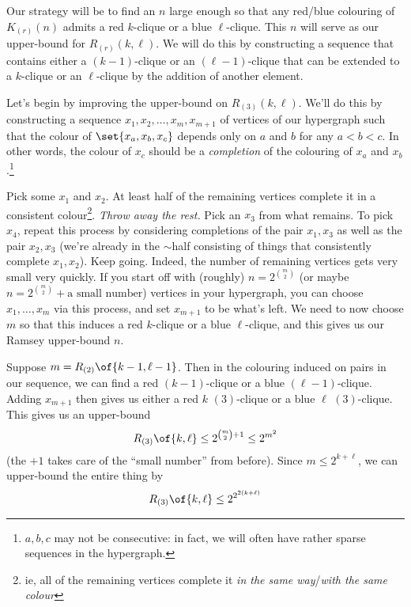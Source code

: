 Our strategy will be to find an $n$ large enough so that any red/blue colouring of $K_{(r)}(n)$ admits a red $k$-clique or a blue $\ell$-clique. This $n$ will serve as our upper-bound for $R_{(r)}(k, \ell)$. We will do this by constructing a sequence that contains either a $(k - 1)$-clique or an $(\ell - 1)$-clique that can be extended to a $k$-clique or an $\ell$-clique by the addition of another element.

Let's begin by improving the upper-bound on $R_{(3)}(k, \ell)$. We'll do this by constructing a sequence $x_1, x_2, \ldots, x_m, x_{m + 1}$ of vertices of our hypergraph such that the colour of $\set{x_a, x_b, x_c}$ depends only on $a$ and $b$ for any $a < b < c$. In other words, the colour of $x_c$ should be a \textit{completion} of the colouring of $x_a$ and $x_b$.\footnote{$a, b, c$ may not be consecutive: in fact, we will often have rather sparse sequences in the hypergraph.}

Pick some $x_1$ and $x_2$. At least half of the remaining vertices complete it in a consistent colour\footnote{ie, all of the remaining vertices complete it \textit{in the same way}/\textit{with the same colour}}. \textit{Throw away the rest.} Pick an $x_3$ from what remains. To pick $x_4$, repeat this process by considering completions of the pair $x_1, x_3$ as well as the pair $x_2, x_3$ (we're already in the $\sim$half consisting of things that consistently complete $x_1, x_2$). Keep going. Indeed, the number of remaining vertices gets very small very quickly. If you start off with (roughly) $n = 2^{\binom{m}{2}}$ (or maybe $n = 2^{\binom{m}{2}} + \text{a small number}$) vertices in your hypergraph, you can choose $x_1, \ldots, x_m$ via this process, and set $x_{m + 1}$ to be what's left. We need to now choose $m$ so that this induces a red $k$-clique or a blue $\ell$-clique, and this gives us our Ramsey upper-bound $n$.

Suppose $m = R_{(2)}\of{k - 1, \ell - 1}$. Then in the colouring induced on pairs in our sequence, we can find a red $(k - 1)$-clique or a blue $(\ell - 1)$-clique. Adding $x_{m + 1}$ then gives us either a red $k$ $(3)$-clique or a blue $\ell$ $(3)$-clique. This gives us an upper-bound
\begin{align*}
    R_{(3)}\of{k, \ell} \leq 2^{\binom{m}{2} + 1} \leq 2^{m^2}
\end{align*}
(the $+1$ takes care of the ``small number'' from before). Since $m \leq 2^{k + \ell}$, we can upper-bound the entire thing by
\begin{align*}
    R_{(3)}\of{k, \ell} \leq 2^{2^{2(k + \ell)}}
\end{align*}

